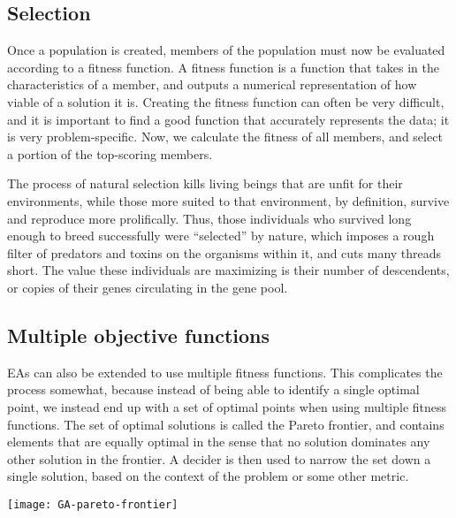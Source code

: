 \subsection{Selection}
Once a population is created, members of the population must now be evaluated according to a fitness function. A fitness function is a function that takes in the characteristics of a member, and outputs a numerical representation of how viable of a solution it is. Creating the fitness function can often be very difficult, and it is important to find a good function that accurately represents the data; it is very problem-specific. Now, we calculate the fitness of all members, and select a portion of the top-scoring members.

The process of natural selection kills living beings that are unfit for their environments, while those more suited to that environment, by definition, survive and reproduce more prolifically. Thus, those individuals who survived long enough to breed successfully were “selected” by nature, which imposes a rough filter of predators and toxins on the organisms within it, and cuts many threads short. The value these individuals are maximizing is their number of descendents, or copies of their genes circulating in the gene pool.



\subsection{Multiple objective functions}
EAs can also be extended to use multiple fitness functions. This complicates the process somewhat, because instead of being able to identify a single optimal point, we instead end up with a set of optimal points when using multiple fitness functions. The set of optimal solutions is called the Pareto frontier, and contains elements that are equally optimal in the sense that no solution dominates any other solution in the frontier. A decider is then used to narrow the set down a single solution, based on the context of the problem or some other metric.


\begin{marginfigure}
\texttt{[image: GA-pareto-frontier]}
\end{marginfigure}


